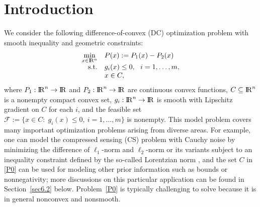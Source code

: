 \documentclass[10pt]{article}
\numberwithin{equation}{section}
\def\R{{\rm I\!R}}
\begin{document}
\section{Introduction}
We consider the following difference-of-convex (DC) optimization problem with smooth inequality and geometric constraints:
\begin{equation}\label{P0}
  \begin{array}{rl}
\min\limits_{x\in\R^n} & P(x) := P_1(x) - P_2(x)\\
{\rm s.t.} & g_i(x)\leq 0,~~ i = 1,\ldots, m,\\
           & x\in C,
  \end{array}
\end{equation}
where $P_1:\R^n\rightarrow\R$ and $P_2:\R^n\rightarrow\R$ are continuous convex functions, $C\subseteq \R^n$ is a nonempty compact convex set, $g_i:\R^n\rightarrow\R$ is smooth with Lipschitz gradient on $C$ for each $i$, and the feasible set $\mathcal{F} :=\{x\in C:\; g_i(x)\le 0, ~ i = 1,\ldots, m\}$ is nonempty. This model problem covers many important optimization problems arising from diverse areas. For example, one can model the compressed sensing (CS) problem with Cauchy noise by minimizing the difference of $\ell_1$-norm and $\ell_2$-norm \cite{YiLH15} or its variants subject to an inequality constraint defined by the so-called Lorentzian norm \cite{CaBA10}, and the set $C$ in \eqref{P0} can be used for modeling other prior information such as bounds or nonnegativity; more discussions on this particular application can be found in Section~\ref{sec6.2} below. Problem~\eqref{P0} is typically challenging to solve because it is in general nonconvex and nonsmooth.%
\end{document}
